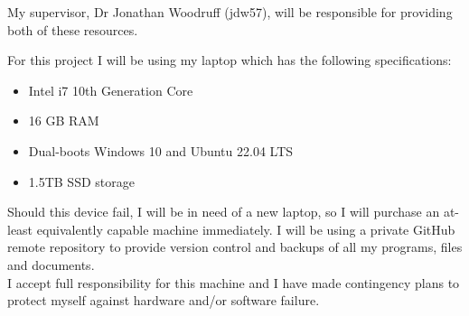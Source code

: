 \documentclass[10pt,a4paper]{article}
\begin{document}
My supervisor, Dr Jonathan Woodruff (jdw57), will be responsible for providing both of these resources.

For this project I will be using my laptop which has the following specifications:
\begin{itemize}
	\item Intel i7 10th Generation Core
	\item 16 GB RAM
	\item Dual-boots Windows 10 and Ubuntu 22.04 LTS
	\item 1.5TB SSD storage
\end{itemize}
Should this device fail, I will be in need of a new laptop, so I will purchase an at-least equivalently capable machine immediately. I will be using a private GitHub remote repository to provide version control and backups of all my programs, files and documents.\\
I accept full responsibility for this machine and I have made contingency plans to protect myself against hardware and/or software failure.

\printbibliography[category=mandatory]
\end{document}
